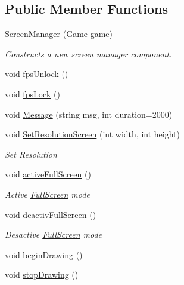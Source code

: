 \subsection*{Public Member Functions}
\begin{DoxyCompactItemize}
\item 
\hyperlink{classgearit_1_1xna_1_1_screen_manager_ac1fd569881c25ef2d9eaf40b1ffa8f07}{Screen\+Manager} (Game game)
\begin{DoxyCompactList}\small\item\em Constructs a new screen manager component. \end{DoxyCompactList}\item 
void \hyperlink{classgearit_1_1xna_1_1_screen_manager_a5a9f3ded28a5f0bdaca3aa09d8c9774b}{fps\+Unlock} ()
\item 
void \hyperlink{classgearit_1_1xna_1_1_screen_manager_adc5ecd7724d23bece79885e8c3059f46}{fps\+Lock} ()
\item 
void \hyperlink{classgearit_1_1xna_1_1_screen_manager_a61cb620b3504877a93ed0520507e8589}{Message} (string msg, int duration=2000)
\item 
void \hyperlink{classgearit_1_1xna_1_1_screen_manager_a33b1139214640e1f29cd486f750ea2bb}{Set\+Resolution\+Screen} (int width, int height)
\begin{DoxyCompactList}\small\item\em Set Resolution \end{DoxyCompactList}\item 
void \hyperlink{classgearit_1_1xna_1_1_screen_manager_a4ad3fd303cbf1a9bc0c18fd3f3e173b0}{active\+Full\+Screen} ()
\begin{DoxyCompactList}\small\item\em Active \hyperlink{classgearit_1_1xna_1_1_full_screen}{Full\+Screen} mode \end{DoxyCompactList}\item 
void \hyperlink{classgearit_1_1xna_1_1_screen_manager_a543e8ed40869732963b2ec49c344aedb}{deactiv\+Full\+Screen} ()
\begin{DoxyCompactList}\small\item\em Desactive \hyperlink{classgearit_1_1xna_1_1_full_screen}{Full\+Screen} mode \end{DoxyCompactList}\item 
void \hyperlink{classgearit_1_1xna_1_1_screen_manager_aeb9ea57c5a60810983210ea753a8d665}{begin\+Drawing} ()
\item 
void \hyperlink{classgearit_1_1xna_1_1_screen_manager_ae0cc1e7caebdd50f39152f33eae7afa2}{stop\+Drawing} ()

\end{DoxyCompactItemize}
